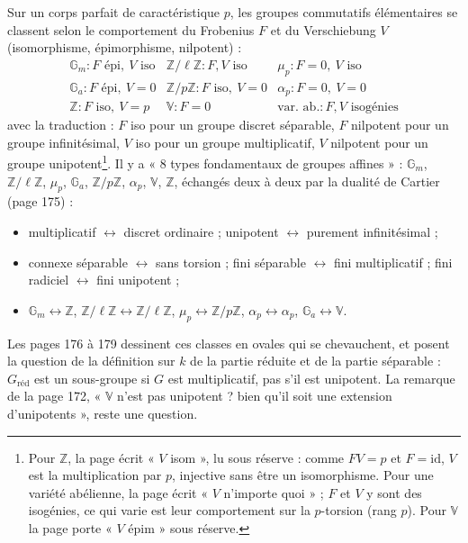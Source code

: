 \documentclass[11pt,a4paper]{article}
\begin{document}
Sur un corps parfait de caractéristique $p$, les groupes commutatifs élémentaires
se classent selon le comportement du Frobenius $F$ et du Verschiebung $V$
(isomorphisme, épimorphisme, nilpotent) :
\[
\begin{array}{lll}
\mathbb{G}_m : F \text{ épi},\ V \text{ iso} &
\mathbb{Z}/\ell\mathbb{Z} : F, V \text{ iso} &
\mu_p : F = 0,\ V \text{ iso} \\
\mathbb{G}_a : F \text{ épi},\ V = 0 &
\mathbb{Z}/p\mathbb{Z} : F \text{ iso},\ V = 0 &
\alpha_p : F = 0,\ V = 0 \\
\mathbb{Z} : F \text{ iso},\ V = p &
\mathbb{V} : F = 0 &
\text{var.\ ab.} : F, V \text{ isogénies}
\end{array}
\]
avec la traduction : $F$ iso pour un groupe discret séparable, $F$ nilpotent pour
un groupe infinitésimal, $V$ iso pour un groupe multiplicatif, $V$ nilpotent pour
un groupe unipotent\footnote{Pour $\mathbb{Z}$, la page écrit « $V$ isom », lu sous
réserve : comme $FV = p$ et $F = \mathrm{id}$, $V$ est la multiplication par $p$,
injective sans être un isomorphisme. Pour une variété abélienne, la page écrit
« $V$ n'importe quoi » ; $F$ et $V$ y sont des isogénies, ce qui varie est leur
comportement sur la $p$-torsion (rang $p$). Pour $\mathbb{V}$ la page porte « $V$
épim » sous réserve.}. Il y a « 8 types fondamentaux de groupes affines » :
$\mathbb{G}_m$, $\mathbb{Z}/\ell\mathbb{Z}$, $\mu_p$, $\mathbb{G}_a$,
$\mathbb{Z}/p\mathbb{Z}$, $\alpha_p$, $\mathbb{V}$, $\mathbb{Z}$, échangés deux à deux
par la dualité de Cartier (page 175) :
\begin{itemize}
\item multiplicatif $\leftrightarrow$ discret ordinaire ; unipotent
$\leftrightarrow$ purement infinitésimal ;
\item connexe séparable $\leftrightarrow$ sans torsion ; fini séparable
$\leftrightarrow$ fini multiplicatif ; fini radiciel $\leftrightarrow$ fini
unipotent ;
\item $\mathbb{G}_m \leftrightarrow \mathbb{Z}$, $\mathbb{Z}/\ell\mathbb{Z}
\leftrightarrow \mathbb{Z}/\ell\mathbb{Z}$, $\mu_p \leftrightarrow
\mathbb{Z}/p\mathbb{Z}$, $\alpha_p \leftrightarrow \alpha_p$, $\mathbb{G}_a
\leftrightarrow \mathbb{V}$.
\end{itemize}
Les pages 176 à 179 dessinent ces classes en ovales qui se chevauchent, et posent
la question de la définition sur $k$ de la partie réduite et de la partie
séparable : $G_{\text{réd}}$ est un sous-groupe si $G$ est multiplicatif, pas
s'il est unipotent. La remarque de la page 172, « $\mathbb{V}$ n'est pas unipotent ?
bien qu'il soit une extension d'unipotents », reste une question.
\end{document}
